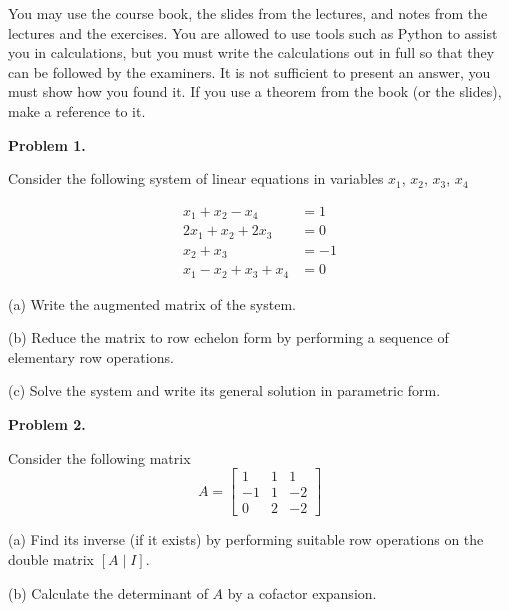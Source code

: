 \documentclass[a4paper,10pt]{article}
\begin{document}
\bigskip

You may use the course book, the slides from the lectures, and notes from
the lectures and the exercises. You are allowed to use tools such as
Python to assist you in calculations, but you must write the calculations out
in full so that they can be followed by the examiners.  It is not
sufficient to present an answer, you must show how you found it.  If you
use a theorem from the book (or the slides), make a reference to
it. \newline
\vspace{10mm}


\noindent
{\bf Problem 1.}

\vspace{3mm}\noindent
Consider the following system of linear equations in variables $x_1$, $x_2$, $x_3$, $x_4$

$$
\begin{aligned}
x_1 + x_2 - x_4 & = 1 \\
2x_1 + x_2 +2x_3 & = 0 \\
x_2 + x_3 & = -1 \\
x_1 - x_2 + x_3 + x_4 & = 0
\end{aligned} 
$$

\vspace{1mm}\noindent
(a) Write the augmented matrix of the system. 

\vspace{1mm}\noindent
(b) Reduce the matrix to row echelon form by performing a sequence of elementary row operations. 

\vspace{1mm}\noindent
(c) Solve the system and write its general solution in parametric form. 

\vspace{20mm}\noindent
{\bf Problem 2.}

\vspace{3mm}\noindent
Consider the following matrix 
$$
A = \left[ \begin{array}{rrr} 1 & 1 & 1 \\ -1 & 1 & -2 \\ 0 & 2 & -2 \end{array} \right]
$$

\vspace{1mm}\noindent
(a) Find its inverse (if it exists) by performing suitable row operations on the double matrix 
$[A \mid I]$. 

\vspace{1mm}\noindent
(b) Calculate the determinant of $A$ by a cofactor expansion. 
\end{document}
